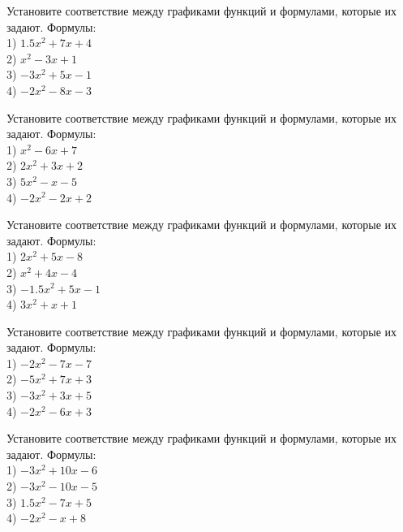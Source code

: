 \documentclass[4apaper]{article}
\begin{document}
\begin{taskBN}{83}
Установите соответствие между графиками функций и формулами, которые их задают. Формулы: \\1) $1.5x^2+7x+4$\\2) $x^2-3x+1$\\3) $-3x^2+5x-1$\\4) $-2x^2-8x-3$
\end{taskBN}

\begin{taskBN}{84}
Установите соответствие между графиками функций и формулами, которые их задают. Формулы: \\1) $x^2-6x+7$\\2) $2x^2+3x+2$\\3) $5x^2-x-5$\\4) $-2x^2-2x+2$
\end{taskBN}

\begin{taskBN}{85}
Установите соответствие между графиками функций и формулами, которые их задают. Формулы: \\1) $2x^2+5x-8$\\2) $x^2+4x-4$\\3) $-1.5x^2+5x-1$\\4) $3x^2+x+1$
\end{taskBN}

\begin{taskBN}{86}
Установите соответствие между графиками функций и формулами, которые их задают. Формулы: \\1) $-2x^2-7x-7$\\2) $-5x^2+7x+3$\\3) $-3x^2+3x+5$\\4) $-2x^2-6x+3$
\end{taskBN}

\begin{taskBN}{87}
Установите соответствие между графиками функций и формулами, которые их задают. Формулы: \\1) $-3x^2+10x-6$\\2) $-3x^2-10x-5$\\3) $1.5x^2-7x+5$\\4) $-2x^2-x+8$
\end{taskBN}
\end{document}
